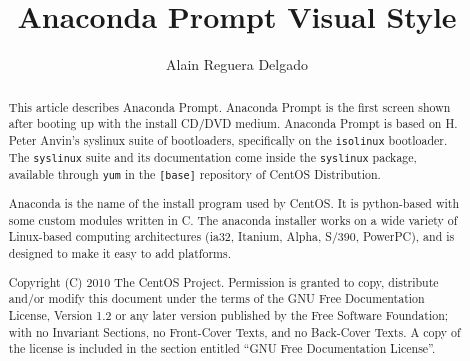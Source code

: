 \documentclass[12pt]{article}
\title{Anaconda Prompt Visual Style}
\author{Alain Reguera Delgado}
\begin{document}
\maketitle

\begin{abstract} 

This article describes Anaconda Prompt. Anaconda Prompt is the first
screen shown after booting up with the install CD/DVD medium. Anaconda
Prompt is based on H. Peter Anvin's syslinux suite of bootloaders,
specifically on the \texttt{isolinux} bootloader. The
\texttt{syslinux} suite and its documentation come inside the
\texttt{syslinux} package, available through \texttt{yum} in the
\texttt{[base]} repository of CentOS Distribution.

Anaconda is the name of the install program used by CentOS.  It is
python-based with some custom modules written in C. The anaconda
installer works on a wide variety of Linux-based computing
architectures (ia32, Itanium, Alpha, S/390, PowerPC), and is designed
to make it easy to add platforms.

Copyright (C) 2010 The CentOS Project. Permission is granted to copy,
distribute and/or modify this document under the terms of the GNU Free
Documentation License, Version 1.2 or any later version published by
the Free Software Foundation; with no Invariant Sections, no
Front-Cover Texts, and no Back-Cover Texts. A copy of the license is
included in the section entitled ``GNU Free Documentation License''.  

\end{abstract}

\tableofcontents








\end{document}
